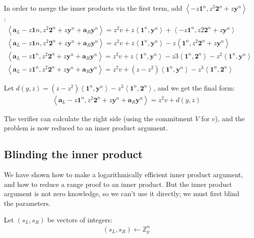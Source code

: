 \documentclass{article}
\begin{document}
In order to merge the inner products via the first term, add $\left<-z \textbf{1}^n, z^2 \textbf{2}^n + z \textbf{y}^n\right>$:
\begin{align}
  \left<\textbf{a}_L - z \textbf{1}n, z^2 \textbf{2}^n + z \textbf{y}^n + \textbf{a}_R \textbf{y}^n\right> = z^2 v + z \left<\textbf{1}^n, \textbf{y}^n\right> + \left<-z \textbf{1}^n, z2 \textbf{2}^n + z \textbf{y}^n\right>\\
  \left<\textbf{a}_L - z \textbf{1}n, z^2 \textbf{2}^n + z \textbf{y}^n + \textbf{a}_R \textbf{y}^n\right> = z^2 v + z \left<\textbf{1}^n, \textbf{y}^n\right> - z \left<\textbf{1}^n, z^2 \textbf{2}^n + z \textbf{y}^n\right>\\
  \left<\textbf{a}_L - z \textbf{1}^n, z^2 \textbf{2}^n + z \textbf{y}^n + \textbf{a}_R \textbf{y}^n\right> = z^2 v + z \left<\textbf{1}^n, \textbf{y}^n\right> - z3 \left<\textbf{1}^n, \textbf{2}^n\right> - z^2 \left<\textbf{1}^n, \textbf{y}^n\right>\\
  \left<\textbf{a}_L - z \textbf{1}^n, z^2 \textbf{2}^n + z \textbf{y}^n + \textbf{a}_R \textbf{y}^n\right> = z^2 v + (z - z^2) \left<\textbf{1}^n, \textbf{y}^n\right> - z^3 \left<\textbf{1}^n, \textbf{2}^n\right>
\end{align}
  
Let $d(y,z) = (z - z^2) \left<\textbf{1}^n, \textbf{y}^n\right> - z^3 \left<\textbf{1}^n, \textbf{2}^n\right>$, and we get the final form:
\begin{align}
  \left<\textbf{a}_L - z \textbf{1}^n, z^2 \textbf{2}^n + z \textbf{y}^n + \textbf{a}_R \textbf{y}^n\right> = z^2 v + d(y,z)
\end{align}

The verifier can calculate the right side (using the commitment $V$ for $v$), and the problem is now reduced to an inner product argument.


\subsection{Blinding the inner product}

We have shown how to make a logarithmically efficient inner product argument, and how to reduce a range proof to an inner product.  But the inner product argument is not zero knowledge, so we can't use it directly; we must first blind the parameters.

Let $(s_L, s_R)$ be vectors of integers:
\begin{align}
  (s_L, s_R) \leftarrow \mathbb{Z}_p^n
\end{align}
\end{document}
